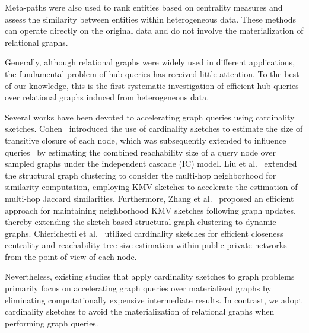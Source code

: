 Meta-paths were also used to rank entities based on centrality measures \cite{10.1145/2020408.2020594, LEE2013684, ShiLYW16} and assess the similarity between entities \cite{sun2011pathsim, xiong2014top, shi2014hetesim, wang2016relsim} within heterogeneous data.
These methods can operate directly on the original data and do not involve the materialization of relational graphs.

Generally, although relational graphs were widely used in different applications, the fundamental problem of hub queries has received little attention. To the best of our knowledge, this is the first systematic investigation of efficient hub queries over relational graphs induced from heterogeneous data.

\vspace{1mm}
Several works have been devoted to accelerating graph queries using cardinality sketches. Cohen~\cite{cohen1997size} introduced the use of cardinality sketches to estimate the size of transitive closure of each node, which was subsequently extended to influence queries~\cite{cohen2014sketch} by estimating the combined reachability size of a query node over sampled graphs under the independent cascade (IC) model. Liu et al.~\cite{liu2023efficient} extended the structural graph clustering to consider the multi-hop neighborhood for similarity computation, employing KMV sketches to accelerate the estimation of multi-hop Jaccard similarities. Furthermore, Zhang et al.~\cite{zhang2022effective} proposed an efficient approach for maintaining neighborhood KMV sketches following graph updates, thereby extending the sketch-based structural graph clustering to dynamic graphs. Chierichetti et al.~\cite{chierichetti2015efficient} utilized cardinality sketches for efficient closeness centrality and reachability tree size estimation within public-private networks from the point of view of each node.

Nevertheless, existing studies that apply cardinality sketches to graph problems primarily focus on accelerating graph queries over materialized graphs by eliminating computationally expensive intermediate results. In contrast, we adopt cardinality sketches to avoid the materialization of relational graphs when performing graph queries.

